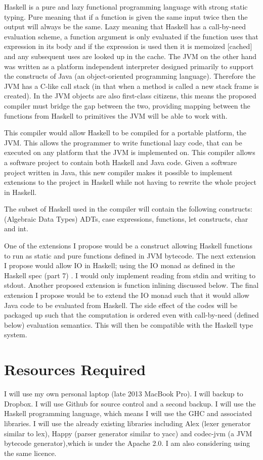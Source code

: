 \documentclass[a4paper]{article}
\begin{document}
  Haskell is a pure and lazy functional programming language with strong static typing. Pure meaning that
  if a function is given the same input twice then the output will always be the same. Lazy meaning that Haskell has a
  call-by-need evaluation scheme, a function argument is only evaluated if the function uses that expression in its body
  and if the expression is used then it is memoized [cached] and any subsequent uses are looked up in the cache.
  The JVM on the other hand was  written as a platform independent interpreter designed
  primarily to support the constructs of Java (an object-oriented programming language).
  Therefore the JVM has a C-like call stack (in that when a method is called a new stack frame is created). In the JVM objects are also first-class citizens, this means
  the proposed compiler must bridge the gap between the two, providing mapping between the functions from Haskell to primitives
  the JVM will be able to work with.

  This compiler would allow Haskell to be compiled for a portable platform, the JVM. This allows the programmer to
  write functional lazy code, that can be executed on any platform that the JVM is implemented on. This compiler allows a software project to contain both
  Haskell and Java code. Given a software project written in Java, this new compiler makes it possible to implement extensions to the project in Haskell
  while not having to rewrite the whole project in Haskell.

  The subset of Haskell used in the compiler will contain the following constructs: (Algebraic Data Types) ADTs, case expressions,
  functions, let constructs, char and int.

  One of the extensions I propose would be a construct allowing Haskell functions to run as static and pure functions defined in JVM bytecode.
  The next extension I propose would allow IO in Haskell; using the IO monad as defined in the Haskell spec (part 7) \cite{haskell98-spec}. 
  I would only implement reading from stdin and writing to stdout. Another proposed extension is function inlining discussed below.
  The final extension I propose would be to extend the IO monad such that it would allow Java code to be evaluated from Haskell. The side effect of the codes
  will be packaged  up such that the computation is ordered even with call-by-need (defined below) evaluation semantics.
  This will then be compatible with the Haskell type system.

\section*{Resources Required}
  I will use my own personal laptop (late 2013 MacBook Pro).
  I will backup to Dropbox.
  I will use Github for source control and a second backup.
  I will use the Haskell programming language, which means I will use the GHC and associated libraries.
  I will use the already existing libraries including Alex (lexer generator similar to lex),
  Happy (parser generator similar to yacc) and codec-jvm (a JVM bytecode generator),which is under the Apache 2.0. I am also considering using the same licence.
\end{document}
